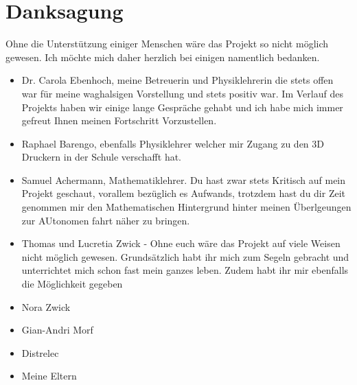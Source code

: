 

\chapter{Danksagung}
\label{chap:danksagung}
Ohne die Unterstützung einiger Menschen wäre das Projekt so nicht möglich gewesen. Ich möchte mich daher herzlich bei einigen namentlich bedanken.
\begin{itemize}
  \item Dr. Carola Ebenhoch, meine Betreuerin und Physiklehrerin die stets offen war für meine waghalsigen Vorstellung und stets positiv war. Im Verlauf des Projekts haben wir einige lange Gespräche gehabt und ich habe mich immer gefreut Ihnen meinen Fortschritt Vorzustellen.
  \item Raphael Barengo, ebenfalls Physiklehrer welcher mir Zugang zu den 3D Druckern in der Schule verschafft hat.
  \item Samuel Achermann, Mathematiklehrer. Du hast zwar stets Kritisch auf mein Projekt geschaut, vorallem bezüglich es Aufwands, trotzdem hast du dir Zeit genommen mir den Mathematischen Hintergrund hinter meinen Überlgeungen zur AUtonomen fahrt näher zu bringen.
  \item Thomas und Lucretia Zwick - Ohne euch wäre das Projekt auf viele Weisen nicht möglich gewesen. Grundsätzlich habt ihr mich zum Segeln gebracht und unterrichtet mich schon fast mein ganzes leben. Zudem habt ihr mir ebenfalls die Möglichkeit gegeben
  \item Nora Zwick
  \item Gian-Andri Morf
  \item Distrelec
  \item Meine Eltern
\end{itemize}
